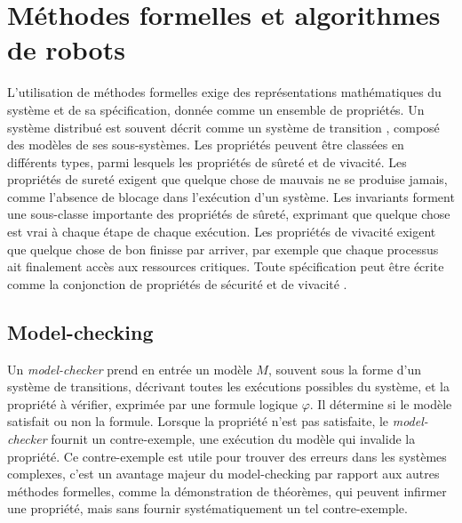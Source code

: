 \section{Méthodes formelles et algorithmes de robots}
L'utilisation de méthodes formelles exige des représentations
mathématiques du système et de sa spécification, donnée comme un
ensemble de propriétés.  Un système distribué est souvent décrit comme
un système de transition \cite{Tel:2001:IDA:517021,
  DBLP:books/mk/Lynch96}, composé des modèles de ses sous-systèmes.
Les propriétés peuvent être classées en différents types, parmi
lesquels les propriétés de sûreté et de vivacité. Les propriétés de
sureté exigent que \og{}quelque chose de mauvais ne se produise
jamais\fg{}, comme l'absence de blocage dans l'exécution d'un système.
Les invariants forment une sous-classe importante des propriétés de
sûreté, exprimant que \og{}quelque chose est vrai à chaque étape de
chaque exécution\fg{}.  Les propriétés de vivacité exigent que
\og{}quelque chose de bon finisse par arriver\fg{}, par exemple que 
chaque processus ait finalement accès aux ressources critiques.  Toute
spécification peut être écrite comme la conjonction de propriétés de
sécurité et de vivacité \cite{AlpernS85}.
		

\subsection{Model-checking}
Un \emph{model-checker} prend en entrée un modèle $M$, souvent sous la
forme d'un système de transitions, décrivant toutes les exécutions
possibles du système, et la propriété à vérifier, exprimée par une
formule logique $\varphi$. Il détermine si le modèle satisfait ou non
la formule. Lorsque la propriété n'est pas satisfaite, le
\emph{model-checker} fournit un contre-exemple, \ie une exécution du
modèle qui invalide la propriété. Ce contre-exemple est utile pour
trouver des erreurs dans les systèmes complexes, c'est un avantage
majeur du model-checking par rapport aux autres méthodes formelles,
comme la démonstration de théorèmes, qui peuvent infirmer une
propriété, mais sans fournir systématiquement un tel contre-exemple.

